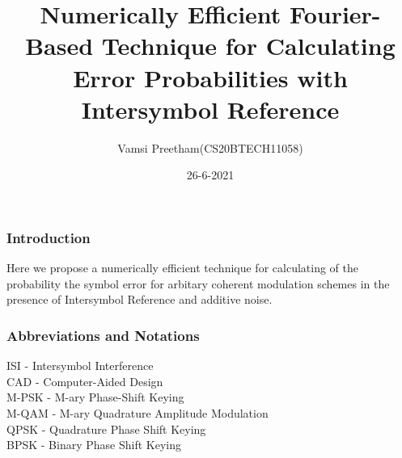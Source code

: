 \documentclass{beamer}
\title{Numerically Efficient Fourier-Based Technique for Calculating Error Probabilities with Intersymbol Reference}
\subtitle{}
\author{Vamsi Preetham(CS20BTECH11058)}
\institute{Indian Institute of Technology Hyderbad}
\date{26-6-2021}
\begin{document}
\begin{frame}
\titlepage
\end{frame}

\begin{frame}
\frametitle{Introduction}
Here we propose a numerically efficient technique for calculating of the probability the symbol error for arbitary coherent modulation schemes in the presence of Intersymbol Reference and additive noise.
\end{frame}

\begin{frame}
\frametitle{Abbreviations and Notations}
\begin{description}
\item[ISI - Intersymbol Interference]
\item[CAD - Computer-Aided Design]
\item[M-PSK - M-ary Phase-Shift Keying]
\item[M-QAM - M-ary Quadrature Amplitude Modulation]
\item[QPSK - Quadrature Phase Shift Keying]
\item[BPSK - Binary Phase Shift Keying]
\end{description}

\end{frame}
\end{document}
